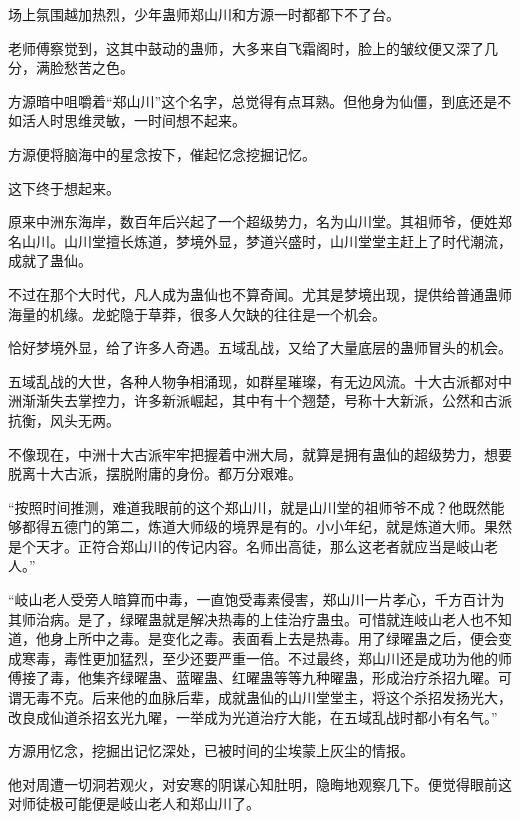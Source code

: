 
\begin{this_body}

场上氛围越加热烈，少年蛊师郑山川和方源一时都都下不了台。

老师傅察觉到，这其中鼓动的蛊师，大多来自飞霜阁时，脸上的皱纹便又深了几分，满脸愁苦之色。

方源暗中咀嚼着“郑山川”这个名字，总觉得有点耳熟。但他身为仙僵，到底还是不如活人时思维灵敏，一时间想不起来。

方源便将脑海中的星念按下，催起忆念挖掘记忆。

这下终于想起来。

原来中洲东海岸，数百年后兴起了一个超级势力，名为山川堂。其祖师爷，便姓郑名山川。山川堂擅长炼道，梦境外显，梦道兴盛时，山川堂堂主赶上了时代潮流，成就了蛊仙。

不过在那个大时代，凡人成为蛊仙也不算奇闻。尤其是梦境出现，提供给普通蛊师海量的机缘。龙蛇隐于草莽，很多人欠缺的往往是一个机会。

恰好梦境外显，给了许多人奇遇。五域乱战，又给了大量底层的蛊师冒头的机会。

五域乱战的大世，各种人物争相涌现，如群星璀璨，有无边风流。十大古派都对中洲渐渐失去掌控力，许多新派崛起，其中有十个翘楚，号称十大新派，公然和古派抗衡，风头无两。

不像现在，中洲十大古派牢牢把握着中洲大局，就算是拥有蛊仙的超级势力，想要脱离十大古派，摆脱附庸的身份。都万分艰难。

“按照时间推测，难道我眼前的这个郑山川，就是山川堂的祖师爷不成？他既然能够都得五德门的第二，炼道大师级的境界是有的。小小年纪，就是炼道大师。果然是个天才。正符合郑山川的传记内容。名师出高徒，那么这老者就应当是岐山老人。”

“岐山老人受旁人暗算而中毒，一直饱受毒素侵害，郑山川一片孝心，千方百计为其师治病。是了，绿曜蛊就是解决热毒的上佳治疗蛊虫。可惜就连岐山老人也不知道，他身上所中之毒。是变化之毒。表面看上去是热毒。用了绿曜蛊之后，便会变成寒毒，毒性更加猛烈，至少还要严重一倍。不过最终，郑山川还是成功为他的师傅接了毒，他集齐绿曜蛊、蓝曜蛊、红曜蛊等等九种曜蛊，形成治疗杀招九曜。可谓无毒不克。后来他的血脉后辈，成就蛊仙的山川堂堂主，将这个杀招发扬光大，改良成仙道杀招玄光九曜，一举成为光道治疗大能，在五域乱战时都小有名气。”

方源用忆念，挖掘出记忆深处，已被时间的尘埃蒙上灰尘的情报。

他对周遭一切洞若观火，对安寒的阴谋心知肚明，隐晦地观察几下。便觉得眼前这对师徒极可能便是岐山老人和郑山川了。


\end{this_body}
